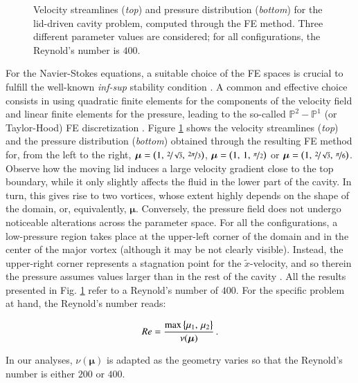 \documentclass[longtitle]{elsarticle}
\numberwithin{equation}{section}
\theoremstyle{theorem}
\theoremstyle{definition}
\theoremstyle{remark}
\theoremstyle{proposition}
\numberwithin{figure}{section}
\newcommand{\wt}[1]{\widetilde{#1}}
\newcommand{\bg}[1]{\boldsymbol{#1}}
\begin{document}
\begin{figure}[t!]
			\caption{Velocity streamlines (\emph{top}) and pressure distribution (\emph{bottom}) for the lid-driven cavity problem, computed through the FE method. Three different parameter values are considered; for all configurations, the Reynold's number is $400$.}
			\label{fig:dc-solutions-different-domains}
		\end{figure}

		\clearpage

		For the Navier-Stokes equations, a suitable choice of the FE spaces is crucial to fulfill the well-known \emph{inf-sup} stability condition \cite{Ran99}. A common and effective choice consists in using quadratic finite elements for the components of the velocity field and linear finite elements for the pressure, leading to the so-called $\mathbb{P}^2 - \mathbb{P}^1$ (or Taylor-Hood) FE discretization \cite{Per02}. Figure \ref{fig:dc-solutions-different-domains} shows the velocity streamlines (\emph{top}) and the pressure distribution (\emph{bottom}) obtained through the resulting FE method for, from the left to the right, $\bg{\mu} = \big( 1, \, \nicefrac{2}{\sqrt{3}}, \, \nicefrac{2 \pi}{3} \big)$, $\bg{\mu} = \big( 1, \, 1, \, \nicefrac{\pi}{2} \big)$ or $\bg{\mu} = \big( 1, \, \nicefrac{2}{\sqrt{3}}, \, \nicefrac{\pi}{6} \big)$. Observe how the moving lid induces a large velocity gradient close to the top boundary, while it only slightly affects the fluid in the lower part of the cavity. In turn, this gives rise to two vortices, whose extent highly depends on the shape of the domain, or, equivalently, $\bg{\mu}$. Conversely, the pressure field does not undergo noticeable alterations across the parameter space. For all the configurations, a low-pressure region takes place at the upper-left corner of the domain and in the center of the major vortex (although it may be not clearly visible). Instead, the upper-right corner represents a stagnation point for the $\wt{x}$-velocity, and so therein the pressure assumes values larger than in the rest of the cavity \cite{Dho14}. All the results presented in Fig. \ref{fig:dc-solutions-different-domains} refer to a Reynold's number of $400$. For the specific problem at hand, the Reynold's number reads:
		\begin{linenomath}\begin{equation*}
			\vspace*{-0.1cm}
			Re = \dfrac{\max \big\lbrace \mu_1, \, \mu_2 \big\rbrace}{\nu(\bg{\mu})} \, .
		\end{equation*}\end{linenomath}
		In our analyses, $\nu(\bg{\mu})$ is adapted as the geometry varies so that the Reynold's number is either $200$ or $400$. 
\end{document}
